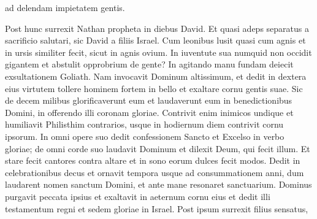 \begin{biblechapter}
\begin{biblechapter}
\begin{biblechapter}
\begin{biblechapter}
\begin{biblechapter}
\begin{biblechapter}
\begin{biblechapter}
\begin{biblechapter}
\begin{biblechapter}
\begin{biblechapter}
\begin{biblechapter}
\begin{biblechapter}
\begin{biblechapter}
\begin{biblechapter}
\begin{biblechapter}
\begin{biblechapter}
\begin{biblechapter}
\begin{biblechapter}
\begin{biblechapter}
\begin{biblechapter}
\begin{biblechapter}
\begin{biblechapter}
\begin{biblechapter}
\begin{biblechapter}
\begin{biblechapter}
\begin{biblechapter}
\begin{biblechapter}
\begin{biblechapter}
\begin{biblechapter}
\begin{biblechapter}
\begin{biblechapter}
\begin{biblechapter}
\begin{biblechapter}
\begin{biblechapter}
\begin{biblechapter}
\begin{biblechapter}
\begin{biblechapter}
\begin{biblechapter}
\begin{biblechapter}
\begin{biblechapter}
\begin{biblechapter}
\begin{biblechapter}
\begin{biblechapter}
\begin{biblechapter}
\begin{biblechapter}
\begin{biblechapter}
 ad delendam impietatem gentis.
 
\begin{biblechapter}
\verse Post hunc surrexit Nathan
 propheta in diebus David.
 \verse Et quasi adeps separatus a sacrificio salutari,
 sic David a filiis Israel.
 \verse Cum leonibus lusit quasi cum agnis
 et in ursis similiter fecit, sicut in agnis ovium.
 \verse In iuventute sua numquid non occidit gigantem
 et abstulit opprobrium de gente?
 \verse In agitando manu fundam
 deiecit exsultationem Goliath.
 \verse Nam invocavit Dominum altissimum,
 et dedit in dextera eius virtutem
 tollere hominem fortem in bello
 et exaltare cornu gentis suae.
 \verse Sic de decem milibus glorificaverunt eum
 et laudaverunt eum in benedictionibus Domini,
 in offerendo illi coronam gloriae.
 \verse Contrivit enim inimicos undique
 et humiliavit Philisthim contrarios,
 usque in hodiernum diem contrivit cornu ipsorum.
 \verse In omni opere suo dedit confessionem
 Sancto et Excelso in verbo gloriae;
 \verse de omni corde suo laudavit Dominum
 et dilexit Deum, qui fecit illum.
 \verse Et stare fecit cantores contra altare
 et in sono eorum dulces fecit modos.
 \verse Dedit in celebrationibus decus
 et ornavit tempora usque ad consummationem anni,
 dum laudarent nomen sanctum Domini,
 et ante mane resonaret sanctuarium.
 \verse Dominus purgavit peccata ipsius
 et exaltavit in aeternum cornu eius et dedit illi testamentum regni
 et sedem gloriae in Israel.
 \verse Post ipsum surrexit filius sensatus,

\end{biblechapter}
\end{biblechapter}
\end{biblechapter}
\end{biblechapter}
\end{biblechapter}
\end{biblechapter}
\end{biblechapter}
\end{biblechapter}
\end{biblechapter}
\end{biblechapter}
\end{biblechapter}
\end{biblechapter}
\end{biblechapter}
\end{biblechapter}
\end{biblechapter}
\end{biblechapter}
\end{biblechapter}
\end{biblechapter}
\end{biblechapter}
\end{biblechapter}
\end{biblechapter}
\end{biblechapter}
\end{biblechapter}
\end{biblechapter}
\end{biblechapter}
\end{biblechapter}
\end{biblechapter}
\end{biblechapter}
\end{biblechapter}
\end{biblechapter}
\end{biblechapter}
\end{biblechapter}
\end{biblechapter}
\end{biblechapter}
\end{biblechapter}
\end{biblechapter}
\end{biblechapter}
\end{biblechapter}
\end{biblechapter}
\end{biblechapter}
\end{biblechapter}
\end{biblechapter}
\end{biblechapter}
\end{biblechapter}
\end{biblechapter}
\end{biblechapter}
\end{biblechapter}
